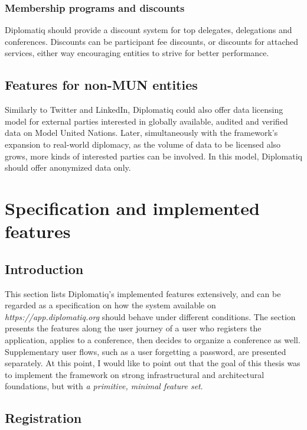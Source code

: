 \subsubsection{Membership programs and discounts}

Diplomatiq should provide a discount system for top delegates, delegations and conferences. Discounts can be participant fee discounts, or discounts for attached services, either way encouraging entities to strive for better performance.

\subsection{Features for non-MUN entities}

Similarly to Twitter and LinkedIn, Diplomatiq could also offer data licensing model for external parties interested in globally available, audited and verified data on Model United Nations. Later, simultaneously with the framework's expansion to real-world diplomacy, as the volume of data to be licensed also grows, more kinds of interested parties can be involved. In this model, Diplomatiq should offer anonymized data only.

\section{Specification and implemented features}
\label{section:specification}

\subsection{Introduction}

This section lists Diplomatiq's implemented features extensively, and can be regarded as a specification on how the system available on \emph{https://app.diplomatiq.org} should behave under different conditions. The section presents the features along the user journey of a user who registers the application, applies to a conference, then decides to organize a conference as well. Supplementary user flows, such as a user forgetting a password, are presented separately. At this point, I would like to point out that the goal of this thesis was to implement the framework on strong infrastructural and architectural foundations, but with \emph{a primitive, minimal feature set}.

\subsection{Registration}

